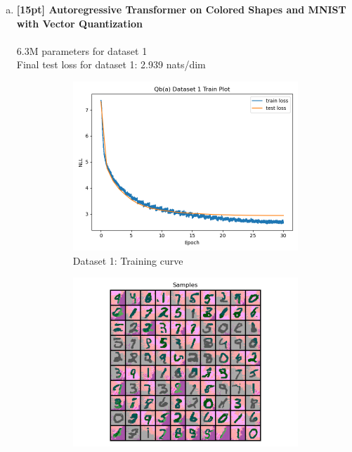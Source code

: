 \documentclass{article}
\begin{document}
\begin{enumerate}[(a)]
\begin{figure}[H]
\begin{subfigure}{0.3\textwidth}
        \caption{Dataset 2: Quantized Examples}
    \end{subfigure} \\
\end{figure}

\item {\bf [15pt] Autoregressive Transformer on Colored Shapes and MNIST with Vector Quantization} \\\\
6.3M parameters for dataset 1 \\
Final test loss for dataset 1: 2.939 nats/dim
\begin{figure}[H]
    \centering
    \begin{subfigure}{0.4\textwidth}
        \centering
        \includegraphics[width=\textwidth]{figures/q4_b_dset1_train_plot.png}
        \caption{Dataset 1: Training curve}
    \end{subfigure}
    \hspace{0.2in}
    \begin{subfigure}{0.4\textwidth}
        \centering
        \includegraphics[width=\textwidth]{figures/q4_b_dset1_samples.png}

\end{subfigure}
\end{figure}
\end{enumerate}
\end{document}
